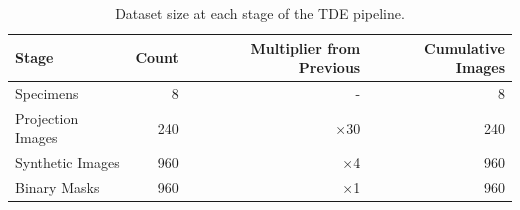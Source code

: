 \begin{table}[htbp]
\caption{Dataset size at each stage of the TDE pipeline.}
\label{tab:dataset_growth}
\begin{tabular}{lrrr}
\toprule
Stage & Count & Multiplier from Previous & Cumulative Images \\
\midrule
Specimens & 8 & - & 8 \\
Projection
Images & 240 & ×30 & 240 \\
Synthetic
Images & 960 & ×4 & 960 \\
Binary
Masks & 960 & ×1 & 960 \\
\bottomrule
\end{tabular}
\end{table}
